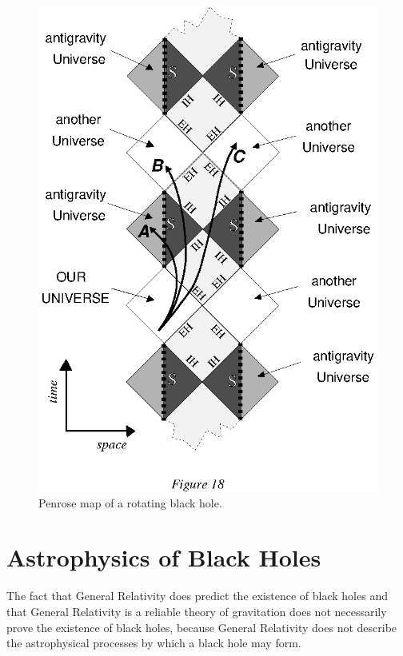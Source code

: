 \documentclass[12pt]{article}
\begin{document}
\begin{figure}[tb]
  \begin{center}
    \leavevmode
    \includegraphics{kerr.ps}
    \caption{Penrose map of a rotating black hole.}
  \end{center}
\end{figure}

\section{Astrophysics of Black Holes}

The fact that General Relativity does predict the existence of black holes and that
General Relativity is a reliable theory of gravitation does not necessarily prove the
existence of black holes, because General Relativity does not describe the
astrophysical processes by which a black hole may form.
\end{document}

